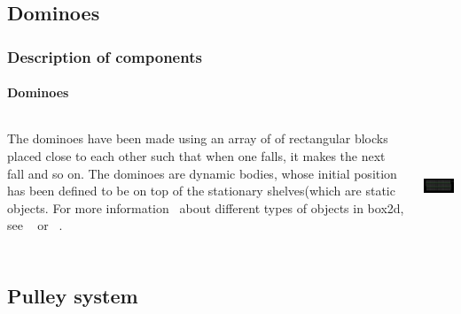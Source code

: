 \subsection{Dominoes}
\begin{frame}
\frametitle{Description of components}
\framesubtitle{Dominoes}
\begin{columns}
\begin{column}{.7\textwidth}
\begin{scriptsize}
The dominoes have been made using an array of of rectangular blocks placed close to each other such that when one falls, it makes the next fall and so on.
\linebreak
\pause
The dominoes are dynamic bodies, whose initial position has been defined to be on top of the stationary shelves(which are static objects. For more information \
about different types of objects in box2d, see ~\cite{Site1} or ~\cite{Site2}.
\end{scriptsize}  
\end{column}
\begin{column}{.4\textwidth}
\pause
\includegraphics[width=4.5cm,height=3.3cm]{dd1}
\end{column}
\end{columns}


\end{frame}




\subsection{Pulley system}

